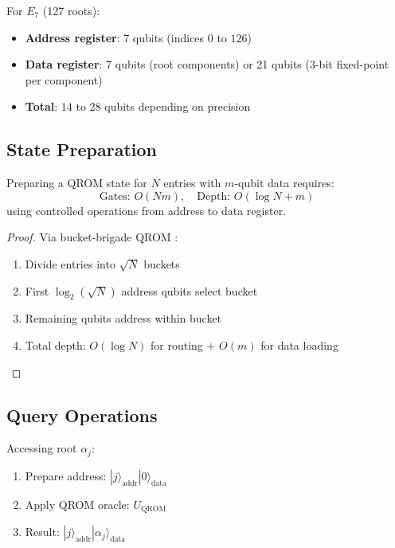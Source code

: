 For $E_7$ (127 roots):
\begin{itemize}
    \item \textbf{Address register}: 7 qubits (indices $0$ to $126$)
    \item \textbf{Data register}: 7 qubits (root components) or 21 qubits (3-bit fixed-point per component)
    \item \textbf{Total}: $14$ to $28$ qubits depending on precision
\end{itemize}

\subsection{State Preparation}

\begin{theorem}
\label{thm:qrom_complexity}
Preparing a QROM state for $N$ entries with $m$-qubit data requires:
\begin{equation}
\text{Gates: } O(Nm), \quad \text{Depth: } O(\log N + m)
\end{equation}
using controlled operations from address to data register.
\end{theorem}

\begin{proof}
Via bucket-brigade QROM \cite{babbush2018encoding}:
\begin{enumerate}
    \item Divide entries into $\sqrt{N}$ buckets
    \item First $\log_2(\sqrt{N})$ address qubits select bucket
    \item Remaining qubits address within bucket
    \item Total depth: $O(\log N)$ for routing + $O(m)$ for data loading
\end{enumerate}
\end{proof}

\subsection{Query Operations}

Accessing root $\alpha_j$:
\begin{enumerate}
    \item Prepare address: $|j\rangle_{\text{addr}} |0\rangle_{\text{data}}$
    \item Apply QROM oracle: $U_{\text{QROM}}$
    \item Result: $|j\rangle_{\text{addr}} |\alpha_j\rangle_{\text{data}}$
\end{enumerate}

